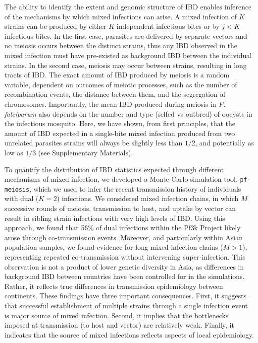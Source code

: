 \documentclass[9pt,lineno]{elife}
\begin{document}
The ability to identify the extent and genomic structure of IBD enables inference of the mechanisms by which mixed infections can arise.  A mixed infection of $K$ strains can be produced by either $K$ independent infectious bites or by $j < K$ infectious bites. In the first case, parasites are delivered by separate vectors and no meiosis occurs between the distinct strains, thus any IBD observed in the mixed infection must have pre-existed as background IBD between the individual strains.  In the second case, meiosis may occur between strains, resulting in long tracts of IBD.  The exact amount of IBD produced by meiosis is a random variable, dependent on outcomes of meiotic processes, such as the number of recombination events, the distance between them, and the segregation of chromosomes.  Importantly, the mean IBD produced during meiosis in \textit{P. falciparum} also depends on the number and type (selfed vs outbred) of oocysts in the infectious mosquito.  Here, we have shown, from first principles, that the amount of IBD expected in a single-bite mixed infection produced from two unrelated parasites strains will always be slightly less than $1/2$, and potentially as low as $1/3$ (see Supplementary Materials).

To quantify the distribution of IBD statistics expected through different mechanisms of mixed infection, we developed a Monte Carlo simulation tool, \texttt{pf-meiosis}, which we used to infer the recent transmission history of individuals with dual ($K=2$) infections.  We considered mixed infection chains, in which $M$ successive rounds of meiosis, transmission to host, and uptake by vector can result in sibling strain infections with very high levels of IBD.  Using this approach, we found that 56\% of dual infections within the Pf3k Project likely arose through co-transmission events. Moreover, and particularly within Asian population samples, we found evidence for long mixed infection chains ($M>1$), representing repeated co-transmission without intervening super-infection.  This observation is not a product of lower genetic diversity in Asia, as differences in background IBD between countries have been controlled for in the simulations. Rather, it reflects true differences in transmission epidemiology between continents. These findings have three important consequences.  First, it suggests that successful establishment of multiple strains through a single infection event is major source of mixed infection.  Second, it implies that the bottlenecks imposed at transmission (to host and vector) are relatively weak.  Finally, it indicates that the source of mixed infections reflects aspects of local epidemiology.
\end{document}
